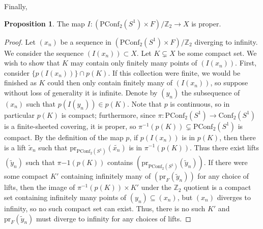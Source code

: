 \documentclass[10pt, oneside]{article}
\newcommand{\Z}{\mathbb{Z}}
\newcommand{\conf}[1]{\text{Conf}_{#1}(S^1)}
\newcommand{\pconf}[1]{\text{PConf}_{#1}(S^1)}
\theoremstyle{definition}
\newtheorem{prop}{Proposition}[section]
\theoremstyle{definition}
\begin{document}
Finally,
\begin{prop}
    The map $I:(\pconf{2}\times F)/\Z_2\to X$ is proper.
\end{prop}
\begin{proof}
    Let $(x_n)$ be a sequence in $(\pconf{2}\times F)/\Z_2$ diverging to infinity. We consider the sequence $(I(x_n))\subset X$. Let $K\subsetneq X$ be some compact set. We wish to show that $K$ may contain only finitely many points of $(I(x_n))$. First, consider $\{p(I(x_n))\}\cap p(K)$. If this collection were finite, we would be finished as $K$ could then only contain finitely many of $(I(x_n))$, so suppose without loss of generality it is infinite. Denote by $(y_n)$ the subsequence of $(x_n)$ such that $p(I(y_n))\in p(K)$. Note that $p$ is continuous, so in particular $p(K)$ is compact; furthermore, since $\pi:\pconf{2}\to \conf{2}$ is a finite-sheeted covering, it is proper, so $\pi^{-1}(p(K)) \subsetneq \pconf{2}$ is compact. By the definition of the map $p$, if $p(I(x_n))$ is in $p(K)$, then there is a lift $\tilde{x}_n$ such that $\text{pr}_{\pconf{2}}(\tilde{x_n})$ is in $\pi^{-1}(p(K))$. Thus there exist lifts $(\tilde{y}_n)$ such that $\pi{-1}(p(K))$ contains $(\text{pr}_{\pconf{2}}(\tilde{y}_n))$. If there were some compact $K'$ containing infinitely many of $(\text{pr}_{F}(\tilde{y}_n))$ for any choice of lifts, then the image of $\pi^{-1}(p(K))\times K'$ under the $\Z_2$ quotient is a compact set containing infinitely many points of $(y_n)\subseteq(x_n)$, but $(x_n)$ diverges to infinity, so no such compact set can exist. Thus, there is no such $K'$ and $\text{pr}_F(\tilde{y}_n)$ must diverge to infinity for any choices of lifts. 


\end{proof}
\end{document}

